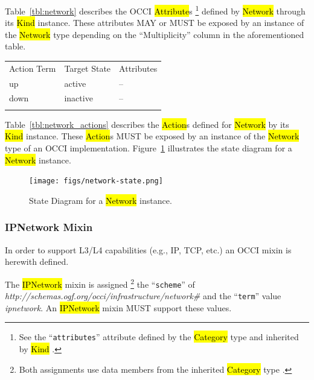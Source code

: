 \documentclass[10pt,a4paper]{article}
\begin{document}
Table~\ref{tbl:network} describes the OCCI \hl{Attribute}s%
\footnote{See the ``{\tt attributes}'' attribute defined by the
  \hl{Category} type and inherited by \hl{Kind} \cite{occi:core}.}
defined by \hl{Network} through its \hl{Kind} instance. These attributes
MAY or MUST be exposed by an instance of the \hl{Network} type
depending on the ``Multiplicity'' column in the aforementioned table.

{
	\begin{tabular}{lll}
	\toprule
	Action Term&Target State&Attributes\\
	\colrule
	up & active & --\\
	down & inactive & --\\
	\botrule
	\end{tabular}
}

Table~\ref{tbl:network_actions} describes the \hl{Action}s defined for
\hl{Network} by its \hl{Kind} instance. These \hl{Action}s MUST be
exposed by an instance of the \hl{Network} type of an OCCI
implementation.  Figure~\ref{fig:network_state} illustrates the state
diagram for a \hl{Network} instance.

\begin{figure}[!h]
	\centering
	\texttt{[image: figs/network-state.png]}
	\caption{State Diagram for a \hl{Network} instance.}
	\label{fig:network_state}
\end{figure}

\subsubsection{IPNetwork Mixin}

In order to support L3/L4 capabilities (e.g., IP, TCP, etc.) an OCCI
mixin is herewith defined.

The \hl{IPNetwork} mixin is assigned%
\footnote{Both assignments use data members from the inherited
  \hl{Category} type \cite{occi:core}.}  the ``{\tt scheme}'' of
\textit{http://schemas.ogf.org/occi/infrastructure/network\#} and the
``{\tt term}'' value \textit{ipnetwork}. An \hl{IPNetwork} mixin
MUST support these values.
\end{document}
